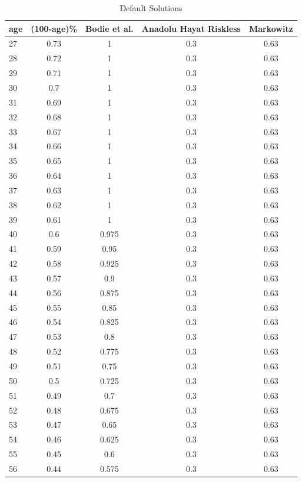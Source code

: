 \documentclass[]{article}
\begin{document}
\begin{appendix}
\begin{table}
	\centering
	\caption[]{Default Solutions}
	\begin{tabular}[c]{lcccc}
		\hline
		age&(100-age)\%&Bodie et al.&Anadolu Hayat Riskless&Markowitz\\
		\hline
		27&0.73&1&0.3&0.63\\
		28&0.72&1&0.3&0.63\\
		29&0.71&1&0.3&0.63\\
		30&0.7&1&0.3&0.63\\
		31&0.69&1&0.3&0.63\\
		32&0.68&1&0.3&0.63\\
		33&0.67&1&0.3&0.63\\
		34&0.66&1&0.3&0.63\\
		35&0.65&1&0.3&0.63\\
		36&0.64&1&0.3&0.63\\
		37&0.63&1&0.3&0.63\\
		38&0.62&1&0.3&0.63\\
		39&0.61&1&0.3&0.63\\
		40&0.6&0.975&0.3&0.63\\
		41&0.59&0.95&0.3&0.63\\
		42&0.58&0.925&0.3&0.63\\
		43&0.57&0.9&0.3&0.63\\
		44&0.56&0.875&0.3&0.63\\
		45&0.55&0.85&0.3&0.63\\
		46&0.54&0.825&0.3&0.63\\
		47&0.53&0.8&0.3&0.63\\
		48&0.52&0.775&0.3&0.63\\
		49&0.51&0.75&0.3&0.63\\
		50&0.5&0.725&0.3&0.63\\
		51&0.49&0.7&0.3&0.63\\
		52&0.48&0.675&0.3&0.63\\
		53&0.47&0.65&0.3&0.63\\
		54&0.46&0.625&0.3&0.63\\
		55&0.45&0.6&0.3&0.63\\
		56&0.44&0.575&0.3&0.63\\
		\hline
	\end{tabular}
\end{table}



\end{appendix}
\end{document}
